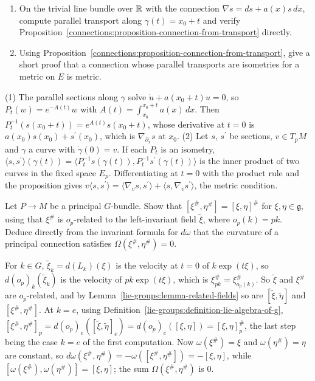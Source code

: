 \begin{exercise}\label{connections:exercise-connection-from-transport}
\begin{enumerate}
\item On the trivial line bundle over $\mathbb{R}$ with the connection $\nabla s = ds + a(x)s\,dx$, compute parallel transport along $\gamma(t) = x_0 + t$ and verify
Proposition~\ref{connections:proposition-connection-from-transport} directly.
\item Using Proposition~\ref{connections:proposition-connection-from-transport}, give a short proof that a connection whose parallel transports are isometries for a metric on $E$ is metric.
\end{enumerate}
\end{exercise}

\begin{solution}
(1) The parallel sections along $\gamma$ solve $\dot u + a(x_0 + t)u = 0$, so $P_t(w) = e^{-A(t)}w$ with $A(t) = \int_{x_0}^{x_0+t}a(x)\,dx$. Then $P_t^{-1}(s(x_0 + t)) = e^{A(t)}s(x_0 + t)$, whose derivative at
$t = 0$ is $a(x_0)s(x_0) + s^{\prime}(x_0)$, which is $\nabla_{\partial_x}s$ at $x_0$. (2) Let $s$, $s^{\prime}$ be sections, $v \in T_pM$ and $\gamma$ a curve with $\dot\gamma(0) = v$. If each $P_t$ is an isometry,
$\langle s, s^{\prime}\rangle(\gamma(t)) = \langle P_t^{-1}s(\gamma(t)), P_t^{-1}s^{\prime}(\gamma(t))\rangle$ is the inner product of two curves in the fixed space $E_p$. Differentiating at $t = 0$ with the product rule
and the proposition gives $v\langle s, s^{\prime}\rangle = \langle\nabla_vs, s^{\prime}\rangle + \langle s, \nabla_vs^{\prime}\rangle$, the metric condition.
\end{solution}

\begin{exercise}\label{connections:exercise-fundamental-bracket}
Let $P \to M$ be a principal $G$-bundle. Show that $[\xi^\#, \eta^\#] = [\xi, \eta]^\#$ for $\xi, \eta \in \mathfrak{g}$, using that $\xi^\#$ is $o_p$-related to the left-invariant field $\widetilde{\xi}$, where
$o_p(k) = pk$. Deduce directly from the invariant formula for $d\omega$ that the curvature of a principal connection satisfies $\Omega(\xi^\#, \eta^\#) = 0$.
\end{exercise}

\begin{solution}
For $k \in G$, $\widetilde{\xi}_k = d(L_k)(\xi)$ is the velocity at $t = 0$ of $k\exp(t\xi)$, so $d(o_p)_k(\widetilde{\xi}_k)$ is the velocity of $pk\exp(t\xi)$, which is $\xi^\#_{pk} = \xi^\#_{o_p(k)}$. So
$\widetilde{\xi}$ and $\xi^\#$ are $o_p$-related, and by Lemma~\ref{lie-groups:lemma-related-fields} so are $[\widetilde{\xi}, \widetilde{\eta}]$ and $[\xi^\#, \eta^\#]$. At $k = e$, using
Definition~\ref{lie-groups:definition-lie-algebra-of-g}, $[\xi^\#, \eta^\#]_p = d(o_p)_e([\widetilde{\xi}, \widetilde{\eta}]_e) = d(o_p)_e([\xi, \eta]) = [\xi, \eta]^\#_p$, the last step being the case
$k = e$ of the first computation. Now $\omega(\xi^\#) = \xi$ and $\omega(\eta^\#) = \eta$ are constant, so $d\omega(\xi^\#, \eta^\#) = -\omega([\xi^\#, \eta^\#]) = -[\xi, \eta]$, while
$[\omega(\xi^\#), \omega(\eta^\#)] = [\xi, \eta]$; the sum $\Omega(\xi^\#, \eta^\#)$ is $0$.
\end{solution}

